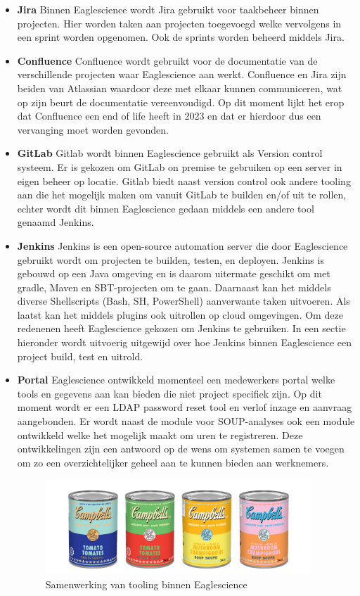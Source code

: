 \begin{itemize}
    \item \textbf{Jira}
    Binnen Eaglescience wordt Jira gebruikt voor taakbeheer binnen projecten. Hier worden taken aan projecten toegevoegd welke vervolgens in een sprint worden opgenomen. Ook de sprints worden beheerd middels Jira.
    \item \textbf{Confluence}
    Confluence wordt gebruikt voor de documentatie van de verschillende projecten waar Eaglescience aan werkt. Confluence en Jira zijn beiden van Atlassian waardoor deze met elkaar kunnen communiceren, wat op zijn beurt de documentatie vereenvoudigd. Op dit moment lijkt het erop dat Confluence een end of life heeft in 2023 en dat er hierdoor dus een vervanging moet worden gevonden.
    \item \textbf{GitLab}
    Gitlab wordt binnen Eaglescience gebruikt als Version control systeem. Er is gekozen om GitLab on premise te gebruiken op een server in eigen beheer op locatie. Gitlab biedt naast version control ook andere tooling aan die het mogelijk maken om vanuit GitLab te builden en/of uit te rollen, echter wordt dit binnen Eaglescience gedaan middels een andere tool genaamd Jenkins.
    \item \textbf{Jenkins}
    Jenkins is een open-source automation server die door Eaglescience gebruikt wordt om projecten te builden, testen, en deployen. Jenkins is gebouwd op een Java omgeving en is daarom uitermate geschikt om met gradle, Maven en SBT-projecten om te gaan. Daarnaast kan het middels diverse Shellscripts (Bash, SH, PowerShell) aanverwante taken uitvoeren. Als laatst kan het middels plugins ook uitrollen op cloud omgevingen. Om deze redenenen heeft Eaglescience gekozen om Jenkins te gebruiken. In een sectie hieronder wordt uitvoerig uitgewijd over hoe Jenkins binnen Eaglescience een project build, test en uitrold.
    \item \textbf{Portal}
    Eaglescience ontwikkeld momenteel een medewerkers portal welke tools en gegevens aan kan bieden die niet project specifiek zijn. Op dit moment wordt er een LDAP password reset tool en verlof inzage en aanvraag aangebonden. Er wordt naast de module voor SOUP-analyses ook een module ontwikkeld welke het mogelijk maakt om uren te registreren. Deze ontwikkelingen zijn een antwoord op de wens om systemen samen te voegen om zo een overzichtelijker geheel aan te kunnen bieden aan werknemers.

    \begin{figure}
        \centering
        \includegraphics[width=10cm]{gfx/soupcans}
        \caption{Samenwerking van tooling binnen Eaglescience}
        \label{fig:es-tooling}
    \end{figure}

\end{itemize}


